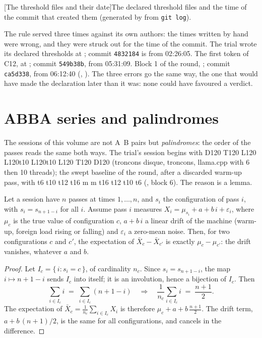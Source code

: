 \begingroup
{}[The threshold files and their date]{The declared threshold files and the time of the commit that created them (generated by  from \texttt{git log}).}\label{t2ann:tab:seuils}

\endgroup

The rule served three times against its own authors: the times written by hand were wrong, and they were struck out for the time of the commit. The trial wrote its declared thresholds at ; commit \texttt{4832184} is from 02:26:05. The first token of C12, at ; commit \texttt{549b38b}, from 05:31:09. Block 1 of the round, ; commit \texttt{ca5d338}, from 06:12:40 (, ). The three errors go the same way, the one that would have made the declaration later than it was: none could have favoured a verdict.

\section{ABBA series and palindromes}\label{t2ann:sec:palindromes}

The sessions of this volume are not A~B pairs but \emph{palindromes}: the order of the passes reads the same both ways. The trial's session begins with D120 T120 L120 L120t10 L120t10 L120 T120 D120 (troncons disque, troncons, llama.cpp with 6 then 10 threads); the swept baseline of the round, after a discarded warm-up pass, with t6 t10 t12 t16 m m t16 t12 t10 t6 (, block 6). The reason is a lemma.

\begin{lemme}\label{t2ann:lem:palindrome}
Let a session have $n$ passes at times $1, \dots, n$, and $s_i$ the configuration of pass $i$, with $s_i = s_{n+1-i}$ for all $i$. Assume pass $i$ measures $X_i = \mu_{s_i} + a + b\,i + \varepsilon_i$, where $\mu_c$ is the true value of configuration $c$, $a + b\,i$ a linear drift of the machine (warm-up, foreign load rising or falling) and $\varepsilon_i$ a zero-mean noise. Then, for two configurations $c$ and $c'$, the expectation of $\bar X_c - \bar X_{c'}$ is exactly $\mu_c - \mu_{c'}$: the drift vanishes, whatever $a$ and $b$.
\end{lemme}
\begin{proof}
Let $I_c = \{\, i : s_i = c \,\}$, of cardinality $n_c$. Since $s_i = s_{n+1-i}$, the map $i \mapsto n+1-i$ sends $I_c$ into itself; it is an involution, hence a bijection of $I_c$. Then
\[
\sum_{i \in I_c} i \;=\; \sum_{i \in I_c} (n+1-i) \quad\Longrightarrow\quad \frac{1}{n_c}\sum_{i \in I_c} i \;=\; \frac{n+1}{2}.
\]
The expectation of $\bar X_c = \frac{1}{n_c}\sum_{i\in I_c} X_i$ is therefore $\mu_c + a + b\,\frac{n+1}{2}$. The drift term, $a + b\,(n+1)/2$, is the same for all configurations, and cancels in the difference.
\end{proof}

